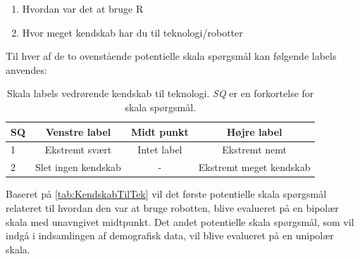 %
\begin{enumerate}
  \item Hvordan var det at bruge R
  \item Hvor meget kendskab har du til teknologi/robotter\blankline 
\end{enumerate}
%
Til hver af de to ovenstående potentielle skala spørgsmål kan følgende labels anvendes:
%
\begin{table}[H]
	\centering 
	\begin{tabular}{l|c|c|c}
		SQ     & Venstre label & Midt punkt & Højre label \\\hline
		1   & Ekstremt svært & Intet label & Ekstremt nemt          \\\hline
		2   & Slet ingen kendskab & - & Ekstremt meget kendskab 
	\end{tabular}
\caption{Skala labels vedrørende kendskab til teknologi. \textit{SQ} er en forkortelse for skala spørgsmål.}
	\label{tab:KendskabTilTek}
\end{table}
\noindent
%
Baseret på \autoref{tab:KendskabTilTek} vil det første potentielle skala spørgsmål relateret til hvordan den var at bruge robotten, blive evalueret på en bipolær skala med unavngivet midtpunkt. Det andet potentielle skala spørgsmål, som vil indgå i indsamlingen af demografisk data, vil blive evalueret på en unipolær skala. 
\newpage
%
